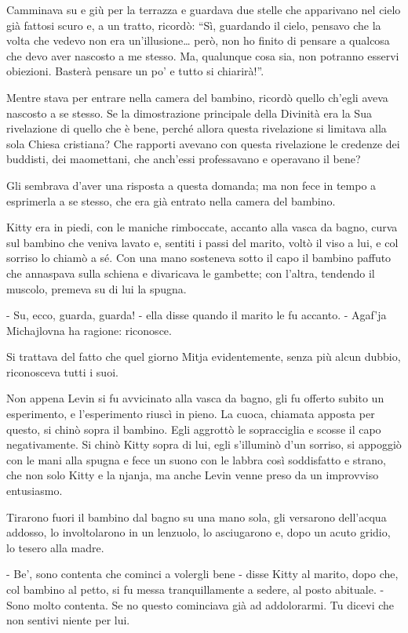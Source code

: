 Camminava su e giù per la terrazza e guardava due stelle che apparivano nel cielo già fattosi scuro e, a un tratto, ricordò: ``Sì, guardando il cielo, pensavo che la volta che vedevo non era un'illusione\ldots{} però, non ho finito di pensare a qualcosa che devo aver nascosto a me stesso. Ma, qualunque cosa sia, non potranno esservi obiezioni. Basterà pensare un po' e tutto si chiarirà!''. 

Mentre stava per entrare nella camera del bambino, ricordò quello ch'egli aveva nascosto a se stesso. Se la dimostrazione principale della Divinità era la Sua rivelazione di quello che è bene, perché allora questa rivelazione si limitava alla sola Chiesa cristiana? Che rapporti avevano con questa rivelazione le credenze dei buddisti, dei maomettani, che anch'essi professavano e operavano il bene? 

Gli sembrava d'aver una risposta a questa domanda; ma non fece in tempo a esprimerla a se stesso, che era già entrato nella camera del bambino. 

Kitty era in piedi, con le maniche rimboccate, accanto alla vasca da bagno, curva sul bambino che veniva lavato e, sentiti i passi del marito, voltò il viso a lui, e col sorriso lo chiamò a sé. Con una mano sosteneva sotto il capo il bambino paffuto che annaspava sulla schiena e divaricava le gambette; con l'altra, tendendo il muscolo, premeva su di lui la spugna. 

- Su, ecco, guarda, guarda! - ella disse quando il marito le fu accanto. - Agaf'ja Michajlovna ha ragione: riconosce. 

Si trattava del fatto che quel giorno Mitja evidentemente, senza più alcun dubbio, riconosceva tutti i suoi. 

Non appena Levin si fu avvicinato alla vasca da bagno, gli fu offerto subito un esperimento, e l'esperimento riuscì in pieno. La cuoca, chiamata apposta per questo, si chinò sopra il bambino. Egli aggrottò le sopracciglia e scosse il capo negativamente. Si chinò Kitty sopra di lui, egli s'illuminò d'un sorriso, si appoggiò con le mani alla spugna e fece un suono con le labbra così soddisfatto e strano, che non solo Kitty e la njanja, ma anche Levin venne preso da un improvviso entusiasmo. 

Tirarono fuori il bambino dal bagno su una mano sola, gli versarono dell'acqua addosso, lo involtolarono in un lenzuolo, lo asciugarono e, dopo un acuto gridio, lo tesero alla madre. 

- Be', sono contenta che cominci a volergli bene - disse Kitty al marito, dopo che, col bambino al petto, si fu messa tranquillamente a sedere, al posto abituale. - Sono molto contenta. Se no questo cominciava già ad addolorarmi. Tu dicevi che non sentivi niente per lui. 

